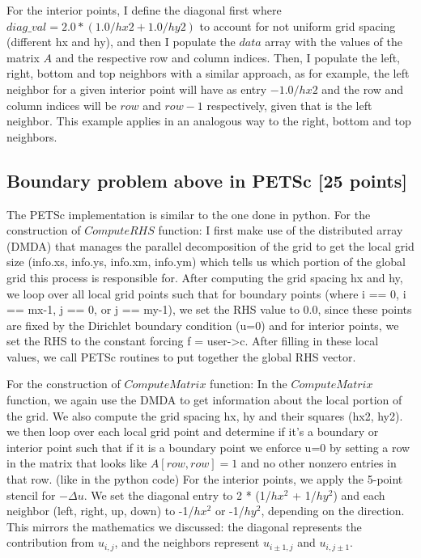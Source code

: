 \documentclass[unicode,11pt,a4paper,oneside,numbers=endperiod,openany]{scrartcl}
\begin{document}
For the interior points, I define the diagonal first where $diag\_val = 2.0*(1.0/hx2 + 1.0/hy2)$ to account
for not uniform grid spacing (different hx and hy), and then I populate the $data$ array with the values of the matrix $A$ and the respective row and column indices.
Then, I populate the left, right, bottom and top neighbors with a similar approach, as for example, the left neighbor for a given interior point 
will have as entry $-1.0/hx2$ and the row and column indices will be $row$ and $row-1$ respectively, given that is the left neighbor. This example applies 
in an analogous way to the right, bottom and top neighbors.
\subsection{Boundary problem above in PETSc [25 points]}
The PETSc implementation is similar to the one done in python. 
For the construction of $ComputeRHS$ function:
I first make use of the distributed array (DMDA) that manages the parallel decomposition of the grid to get the local grid size (info.xs, info.ys, info.xm, info.ym) which tells us which portion of the global grid this process is responsible for. 
After computing the grid spacing hx and hy, we loop over all local grid points such that for boundary points (where i == 0, i == mx-1, j == 0, or j == my-1), we set the RHS value to 0.0, since these points are fixed by the Dirichlet boundary condition (u=0) and 
for interior points, we set the RHS to the constant forcing f = user->c. 
After filling in these local values, we call PETSc routines to put together the global RHS vector. 

For the construction of $ComputeMatrix$ function:
In the $ComputeMatrix$ function, we again use the DMDA to get information about the local portion of the grid. We also compute the grid spacing hx, hy and their squares (hx2, hy2). we then loop over each local grid point and determine if it’s a boundary or interior point such that if it is a boundary point we enforce u=0 by setting a row in the matrix that looks like $A[row,row] = 1$ and no other nonzero entries in that row. (like in the python code)
For the interior points, we apply the 5-point stencil for $-\Delta u$. We set the diagonal entry to 2 * (1/$hx^2$ + 1/$hy^2$) and each neighbor (left, right, up, down) to -1/$hx^2$ or -1/$hy^2$, depending on the direction. 
This mirrors the mathematics we discussed: the diagonal represents the contribution from $u_{i,j}$, and the neighbors represent $u_{i\pm1,j}$ and $u_{i,j\pm1}$.
\end{document}
